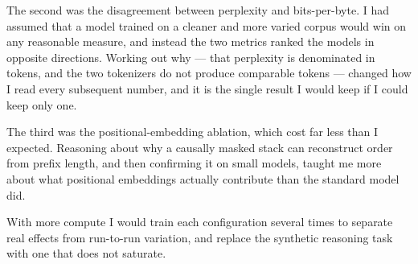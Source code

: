 \documentclass[10pt,a4paper]{article}
\begin{document}
The second was the disagreement between perplexity and bits-per-byte. I had
assumed that a model trained on a cleaner and more varied corpus would win on any
reasonable measure, and instead the two metrics ranked the models in opposite
directions. Working out why --- that perplexity is denominated in tokens, and the
two tokenizers do not produce comparable tokens --- changed how I read every
subsequent number, and it is the single result I would keep if I could keep only
one.

The third was the positional-embedding ablation, which cost far less than I
expected. Reasoning about why a causally masked stack can reconstruct order from
prefix length, and then confirming it on small models, taught me more about what
positional embeddings actually contribute than the standard model did.

With more compute I would train each configuration several times to separate real
effects from run-to-run variation, and replace the synthetic reasoning task with
one that does not saturate.
\end{document}
